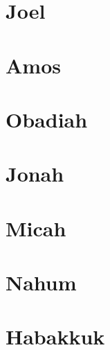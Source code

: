 \chapter{Joel}
\begin{multicols}{2}
  \raggedcolumns
  \parskip=0pt \relax
  
\end{multicols}

\chapter{Amos}
\begin{multicols}{2}
  \raggedcolumns
  \parskip=0pt \relax
  
\end{multicols}

\chapter{Obadiah}
\begin{multicols}{2}
  \raggedcolumns
  \parskip=0pt \relax
  
\end{multicols}

\chapter{Jonah}
\begin{multicols}{2}
  \raggedcolumns
  \parskip=0pt \relax
  
\end{multicols}

\chapter{Micah}
\begin{multicols}{2}
  \raggedcolumns
  \parskip=0pt \relax
  
\end{multicols}

\chapter{Nahum}
\begin{multicols}{2}
  \raggedcolumns
  \parskip=0pt \relax
  
\end{multicols}

\chapter{Habakkuk}
\begin{multicols}{2}
  \raggedcolumns
  \parskip=0pt \relax
  
\end{multicols}

